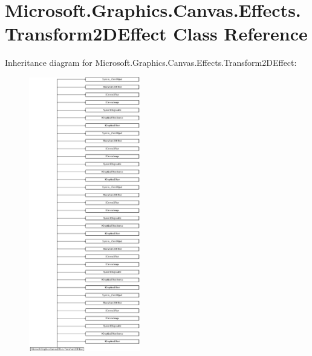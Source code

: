 \hypertarget{class_microsoft_1_1_graphics_1_1_canvas_1_1_effects_1_1_transform2_d_effect}{}\section{Microsoft.\+Graphics.\+Canvas.\+Effects.\+Transform2\+D\+Effect Class Reference}
\label{class_microsoft_1_1_graphics_1_1_canvas_1_1_effects_1_1_transform2_d_effect}
Inheritance diagram for Microsoft.\+Graphics.\+Canvas.\+Effects.\+Transform2\+D\+Effect\+:\begin{figure}[H]
\begin{center}
\leavevmode
\includegraphics[height=12.000000cm]{class_microsoft_1_1_graphics_1_1_canvas_1_1_effects_1_1_transform2_d_effect}
\end{center}
\end{figure}
